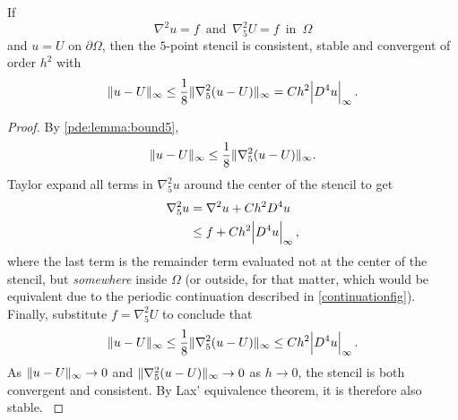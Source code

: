 \begin{theorem}\label{thm:five}
If 
$$ \nabla^2 u = f \,\,\, \text{and} \,\,\, \nabla_5^2 U = f \,\,\, \text{in} \,\,\, \Omega $$
and $u = U$ on $\partial \Omega$, then the $5$-point stencil is consistent, stable and convergent of order $h^2$ with
$$ \lVert u - U \rVert_\infty \leq \frac18 \lVert \nabla_5^2(u-U) \rVert_\infty = Ch^2 \abs{D^4 u}_\infty. $$
\end{theorem}
\begin{proof}
By \cref{pde:lemma:bound5},
$$
\lVert u - U \rVert_\infty \leq \frac18 \lVert \nabla_5^2 (u  - U) \rVert_\infty.
$$
Taylor expand all terms in $\nabla_5^2 u$ around the center of the stencil to get
\begin{equation}
\begin{split}
	\nabla_5^2 u &= \nabla^2 u + C h^2 D^4 u  \\
	             &\leq f + Ch^2 \abs{D^4 u}_\infty,\\
\end{split}
\label{eq:pde:taylornabla2}
\end{equation}
where the last term is the remainder term evaluated not at the center of the stencil, but \emph{somewhere} inside $\Omega$ (or outside, for that matter, which would be equivalent due to the periodic continuation described in \cref{continuationfig}).
Finally, substitute $f = \nabla_5^2 U$ to conclude that
\begin{equation*}
  \lVert u - U \rVert_\infty
  \leq \frac18 \lVert \nabla_5^2 (u  - U) \rVert_\infty
  \leq C h^2 \abs{D^4 u}_\infty. \qedhere
\end{equation*}
As $\lVert u-U \rVert_\infty \rightarrow 0$ and $\lVert \nabla_5^2(u-U) \rVert_\infty \rightarrow 0$ as $h \rightarrow 0$, the stencil is both convergent and consistent.
By Lax' equivalence theorem, it is therefore also stable. \cite{owren}
\end{proof}


